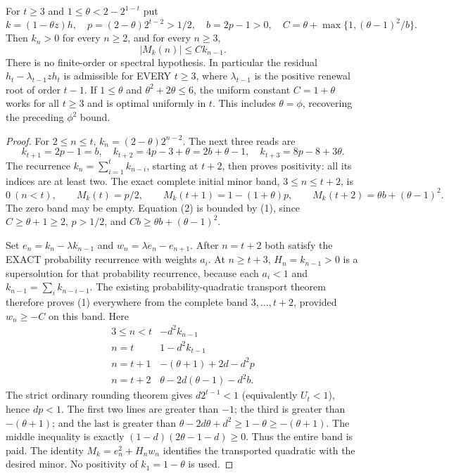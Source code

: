 \begin{theorem}
For $t\ge3$ and $1\le\theta<2-2^{1-t}$ put
\[
 k=(1-\theta z)h,\quad p=(2-\theta)2^{t-2}>1/2,
 \quad b=2p-1>0,\quad
 C=\theta+\max\{1,(\theta-1)^2/b\}.
\]
Then $k_n>0$ for every $n\ge2$, and for every $n\ge3$,
\[
                      |M_k(n)|\le C k_{n-1}.                 \tag{1}
\]
There is no finite-order or spectral hypothesis. In particular the
residual $h_t-\lambda_{t-1}z h_t$ is admissible for EVERY $t\ge3$,
where $\lambda_{t-1}$ is the positive renewal root of order $t-1$.
If $1\le\theta$ and $\theta^2+2\theta\le6$, the uniform constant
$C=1+\theta$ works for all $t\ge3$ and is optimal uniformly in $t$.
This includes $\theta=\phi$, recovering the preceding $\phi^2$ bound.
\end{theorem}
\begin{proof}
For $2\le n\le t$, $k_n=(2-\theta)2^{n-2}$. The next three reads are
\[
 k_{t+1}=2p-1=b,\quad k_{t+2}=4p-3+\theta=2b+\theta-1,
 \quad k_{t+3}=8p-8+3\theta.
\]
The recurrence $k_n=\sum_{i=1}^t k_{n-i}$, starting at $t+2$,
then proves positivity: all its indices are at least two. The exact
complete initial minor band, $3\le n\le t+2$, is
\[
 0\ (n<t),\qquad M_k(t)=p/2,\qquad
 M_k(t+1)=1-(1+\theta)p,\qquad
 M_k(t+2)=\theta b+(\theta-1)^2.                    \tag{2}
\]
The zero band may be empty. Equation (2) is bounded by (1), since
$C\ge\theta+1\ge2$, $p>1/2$, and
$C b\ge\theta b+(\theta-1)^2$.

Set $e_n=k_n-\lambda k_{n-1}$ and
$w_n=\lambda e_n-e_{n+1}$. After $n=t+2$ both satisfy the
EXACT probability recurrence with weights $a_i$. At $n\ge t+3$,
$H_n=k_{n-1}>0$ is a supersolution for that probability recurrence,
because each $a_i<1$ and $k_{n-1}=\sum_i k_{n-i-1}$.
The existing probability-quadratic transport theorem therefore proves
(1) everywhere from the complete band $3,\ldots,t+2$, provided
$w_n\ge-C$ on this band. Here
\[
 \begin{array}{c|c}
 3\le n<t&-d^2 k_{n-1}\\
 n=t&1-d^2 k_{t-1}\\
 n=t+1&-(\theta+1)+2d-d^2p\\
 n=t+2&\theta-2d(\theta-1)-d^2b.
 \end{array}                                                   \tag{3}
\]
The strict ordinary rounding theorem gives $d2^{t-1}<1$ (equivalently
$U_t<1$), hence $dp<1$. The first two lines are greater than $-1$;
the third is greater than $-(\theta+1)$; and the last is greater than
$\theta-2d\theta+d^2\ge1-\theta\ge-(\theta+1)$.
The middle inequality is exactly
$(1-d)(2\theta-1-d)\ge0$. Thus the entire band is paid.
The identity $M_k=e_n^2+H_n w_n$ identifies the transported quadratic
with the desired minor. No positivity of $k_1=1-\theta$ is used.


\end{proof}
